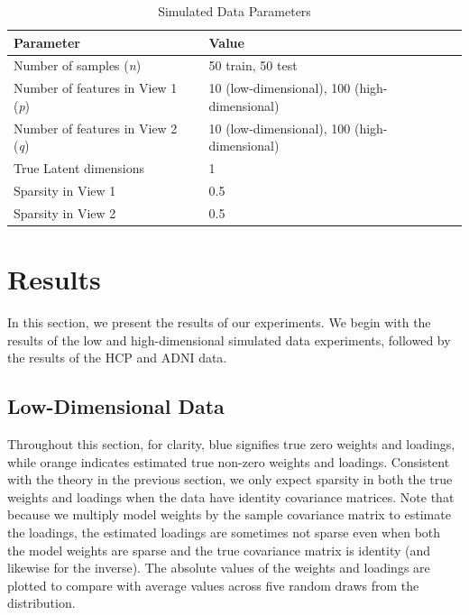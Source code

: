 \begin{table}
\centering
\caption{Simulated Data Parameters}
\begin{tabular}{| l | l |}
\hline
\textbf{Parameter} & \textbf{Value} \\
\hline
Number of samples (\textit{n}) & 50 train, 50 test \\
Number of features in View 1 (\textit{p}) & 10 (low-dimensional), 100 (high-dimensional) \\
Number of features in View 2 (\textit{q}) & 10 (low-dimensional), 100 (high-dimensional) \\
True Latent dimensions & 1 \\
Sparsity in View 1 & 0.5 \\
Sparsity in View 2 & 0.5 \\
\hline
\end{tabular}\label{tab:simulated-data-parameters}
\end{table}

\section{Results}

In this section, we present the results of our experiments.
We begin with the results of the low and high-dimensional simulated data experiments, followed by the results of the HCP and ADNI data.

\subsection{Low-Dimensional Data}

Throughout this section, for clarity, blue signifies true zero weights and loadings, while orange indicates estimated true non-zero weights and loadings.
Consistent with the theory in the previous section, we only expect sparsity in both the true weights and loadings when the data have identity covariance matrices.
Note that because we multiply model weights by the sample covariance matrix to estimate the loadings, the estimated loadings are sometimes not sparse even when both the model weights are sparse and the true covariance matrix is identity (and likewise for the inverse).
The absolute values of the weights and loadings are plotted to compare with average values across five random draws from the distribution.

